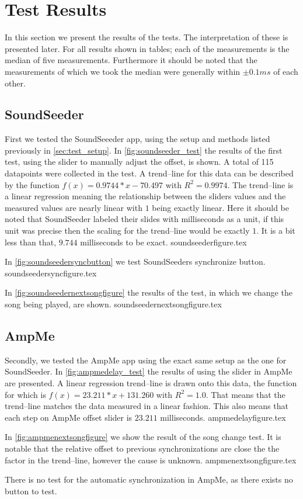\section{Test Results}
In this section we present the results of the tests.
The interpretation of these is presented later.
For all results shown in tables; each of the measurements is the median of five measurements. 
Furthermore it should be noted that the measurements of which we took the median were generally within $\pm 0.1 ms$ of each other. 

\subsection{SoundSeeder}
First we tested the SoundSeeeder app, using the setup and methods listed previously in \cref{sec:test_setup}.
In \vref{fig:soundseeder_test} the results of the first test, using the slider to manually adjust the offset, is shown. 
A total of 115 datapoints were collected in the test.
A trend--line for this data can be described by the function $f(x) = 0.9744 * x - 70.497$ with $R^2=0.9974$.
The trend--line is a linear regression meaning the relationship between the sliders values and the measured values are nearly linear with $1$ being exactly linear.
Here it should be noted that SoundSeeder labeled their slides with milliseconds as a unit, if this unit was precise then the scaling for the trend--line would be exactly $1$.
It is a bit less than that, $9.744$ milliseconds to be exact.
{soundseederfigure.tex}

In \vref{fig:soundseedersyncbutton} we test SoundSeeders synchronize button.
{soundseedersyncfigure.tex}

In \vref{fig:soundseedernextsongfigure} the results of the test, in which we change the song being played, are shown. 
{soundseedernextsongfigure.tex}

\subsection{AmpMe}
Secondly, we tested the AmpMe app using the exact same setup as the one for SoundSeeder. 
In \vref{fig:ampmedelay_test} the results of using the slider in AmpMe are presented.
A linear regression trend--line is drawn onto this data, the function for which is $f(x) = 23.211 * x + 131.260$ with $R^2 = 1.0$.
That means that the trend--line matches the data measured in a linear fashion. 
This also means that each step on AmpMe offset slider is $23.211$ milliseconds. 
{ampmedelayfigure.tex}

In \vref{fig:ampmenextsongfigure} we show the result of the song change test. 
It is notable that the relative offset to previous synchronizations are close the the factor in the trend--line, however the cause is unknown. 
{ampmenextsongfigure.tex}

There is no test for the automatic synchronization in AmpMe, as there exists no button to test. 

